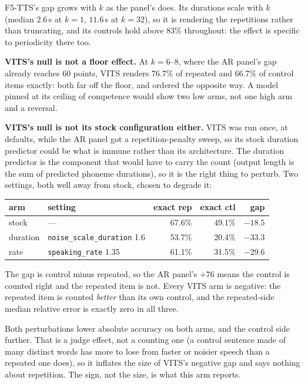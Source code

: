 \documentclass[11pt]{article}
\begin{document}
F5-TTS's gap grows with $k$ as the panel's does. Its durations scale with $k$
(median $2.6$\,s at $k\!=\!1$, $11.6$\,s at $k\!=\!32$), so it is rendering the
repetitions rather than truncating, and its controls hold above $83\%$
throughout: the effect is specific to periodicity there too.

\noindent\textbf{VITS's null is not a floor effect.} At $k=6\text{--}8$, where the
AR panel's gap already reaches $60$ points, VITS renders $76.7\%$ of repeated and
$66.7\%$ of control items exactly: both far off the floor, and ordered the
opposite way. A model pinned at its ceiling of competence would show two low arms,
not one high arm and a reversal.

\noindent\textbf{VITS's null is not its stock configuration either.} VITS was
run once, at defaults, while the AR panel got a repetition-penalty sweep, so
its stock duration predictor could be what is immune rather than its
architecture. The duration predictor is the component that would have to carry
the count (output length is the sum of predicted phoneme durations), so it is the
right thing to perturb. Two settings, both well away from stock, chosen to
degrade it:

\begin{center}
\begin{tabular}{llrrr}
\toprule
arm & setting & exact rep & exact ctl & gap \\
\midrule
stock     & ---                          & 67.6\% & 49.1\% & $-18.5$ \\
duration  & \texttt{noise\_scale\_duration} 1.6 & 53.7\% & 20.4\% & $-33.3$ \\
rate      & \texttt{speaking\_rate} 1.35        & 61.1\% & 31.5\% & $-29.6$ \\
\bottomrule
\end{tabular}
\end{center}

\noindent The gap is control minus repeated, so the AR panel's $+76$ means the
control is counted right and the repeated item is not. Every VITS arm is
negative: the repeated item is counted \emph{better} than its own control, and
the repeated-side median relative error is exactly zero in all three.

Both perturbations lower absolute accuracy on both arms, and the control side
further. That is a judge effect, not a counting one (a control sentence made
of many distinct words has more to lose from faster or noisier speech than a
repeated one does), so it inflates the size of VITS's negative gap and says
nothing about repetition. The sign, not the size, is what this arm reports.
\end{document}
